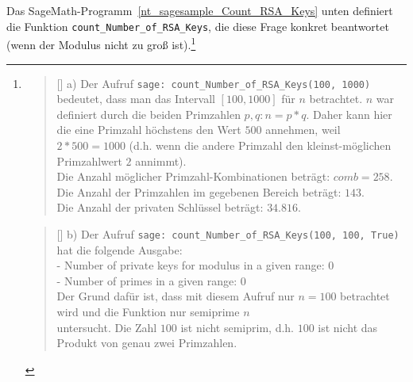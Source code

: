 \begin{refsegment}
\newpage
 Das SageMath-Programm~\ref{nt_sagesample_Count_RSA_Keys} unten
definiert die Funktion \verb#count_Number_of_RSA_Keys#, die diese Frage konkret
beantwortet (wenn der Modulus nicht zu groß ist).\footnote{%
\newlength{\saveleftmargini}
\setlength{\saveleftmargini}{\leftmargini}
\setlength{\leftmargini}{0em}%
\settowidth{\versewidth}{xxxxx xxxxx xxxxx xxxxx xxxxx xxxxx xxxxx xxxxx xxxxx xxxxx xxxxx xxxxx xxxxx xxxxx xxxxx xxxxx xxxxx xxxxx}
\vspace{-\baselineskip} %
\begin{verse}[\versewidth]
 a) Der Aufruf \verb#sage: count_Number_of_RSA_Keys(100, 1000)# bedeutet, dass
man das Intervall $[100, 1000]$ für $n$ betrachtet.
$n$ war definiert durch die beiden Primzahlen $p, q: n = p*q$.
\verselinebreak Daher kann hier die eine Primzahl höchstens den Wert $500$ annehmen, weil
$2 * 500 =1000$ (d.h. wenn die andere Primzahl den kleinst-möglichen Primzahlwert $2$
annimmt).\\
\vin Die Anzahl möglicher Primzahl-Kombinationen beträgt: $comb = 258$.\\
\vin Die Anzahl der Primzahlen im gegebenen Bereich beträgt: $143$.\\
\vin Die Anzahl der privaten Schlüssel beträgt: $34.816$.
\end{verse}
\begin{verse}[\versewidth]
 b) Der Aufruf \verb#sage: count_Number_of_RSA_Keys(100, 100, True)#
hat die folgende Ausgabe:\\
\vin    - Number of private keys for modulus in a given range: 0\\
\vin    - Number of primes in a given range: 0\\
\vin   Der Grund dafür ist, dass mit diesem Aufruf nur $n=100$ betrachtet wird und
   die Funktion nur semiprime $n$\\ %
\vin untersucht. Die Zahl $100$ ist nicht
   semiprim, d.h. $100$ ist nicht das Produkt von genau zwei Primzahlen.
\end{verse}
\setlength{\leftmargini}{\saveleftmargini}%
}



\end{refsegment}
